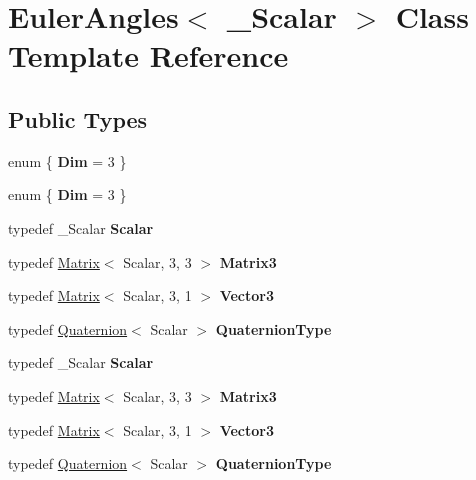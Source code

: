 \hypertarget{class_euler_angles}{}\section{Euler\+Angles$<$ \+\_\+\+Scalar $>$ Class Template Reference}
\label{class_euler_angles}
\subsection*{Public Types}
\begin{DoxyCompactItemize}
\item 
\mbox{\label{class_euler_angles_aca621c14b901f8b5c8e0f7394123a31c}} 
enum \{ {\bfseries Dim} = 3
 \}
\item 
\mbox{\label{class_euler_angles_a3078affdce68a0391689fc3ab023710a}} 
enum \{ {\bfseries Dim} = 3
 \}
\item 
\mbox{\label{class_euler_angles_a5ffd53b93bfcb4963e95424228879216}} 
typedef \+\_\+\+Scalar {\bfseries Scalar}
\item 
\mbox{\label{class_euler_angles_a6d123fcba956986fd611a39a8588e7b9}} 
typedef \hyperlink{group___core___module_class_eigen_1_1_matrix}{Matrix}$<$ Scalar, 3, 3 $>$ {\bfseries Matrix3}
\item 
\mbox{\label{class_euler_angles_ac3064c82bddff4dd7667c15b75e969b6}} 
typedef \hyperlink{group___core___module_class_eigen_1_1_matrix}{Matrix}$<$ Scalar, 3, 1 $>$ {\bfseries Vector3}
\item 
\mbox{\label{class_euler_angles_a450bc52c31edd4dab731e580f5197f48}} 
typedef \hyperlink{group___geometry___module_class_eigen_1_1_quaternion}{Quaternion}$<$ Scalar $>$ {\bfseries Quaternion\+Type}
\item 
\mbox{\label{class_euler_angles_a5ffd53b93bfcb4963e95424228879216}} 
typedef \+\_\+\+Scalar {\bfseries Scalar}
\item 
\mbox{\label{class_euler_angles_a6d123fcba956986fd611a39a8588e7b9}} 
typedef \hyperlink{group___core___module_class_eigen_1_1_matrix}{Matrix}$<$ Scalar, 3, 3 $>$ {\bfseries Matrix3}
\item 
\mbox{\label{class_euler_angles_ac3064c82bddff4dd7667c15b75e969b6}} 
typedef \hyperlink{group___core___module_class_eigen_1_1_matrix}{Matrix}$<$ Scalar, 3, 1 $>$ {\bfseries Vector3}
\item 
\mbox{\label{class_euler_angles_a450bc52c31edd4dab731e580f5197f48}} 
typedef \hyperlink{group___geometry___module_class_eigen_1_1_quaternion}{Quaternion}$<$ Scalar $>$ {\bfseries Quaternion\+Type}
\end{DoxyCompactItemize}
